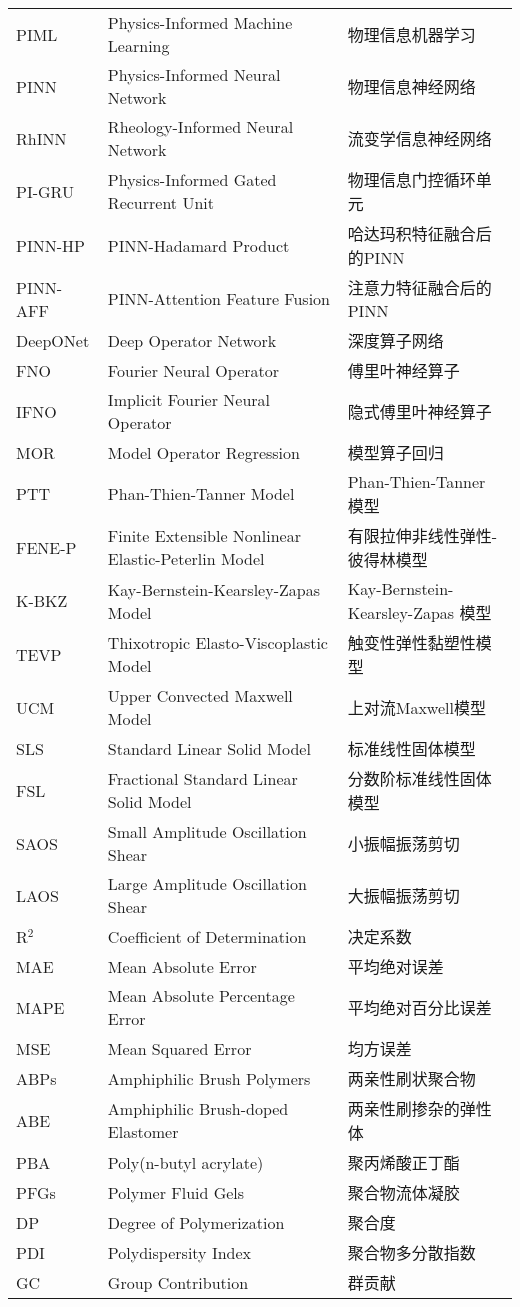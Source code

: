 \begin{longtable}{lll}
	PIML     & Physics-Informed Machine Learning                  & 物理信息机器学习\tabularnewline
	PINN     & Physics-Informed Neural Network                    & 物理信息神经网络\tabularnewline
	RhINN    & Rheology-Informed Neural Network                   & 流变学信息神经网络\tabularnewline
	PI-GRU   & Physics-Informed Gated Recurrent Unit              & 物理信息门控循环单元\tabularnewline
	PINN-HP  & PINN-Hadamard Product                              & 哈达玛积特征融合后的PINN\tabularnewline
	PINN-AFF & PINN-Attention Feature Fusion                      & 注意力特征融合后的PINN\tabularnewline

	DeepONet & Deep Operator Network                              & 深度算子网络\tabularnewline
	FNO      & Fourier Neural Operator                            & 傅里叶神经算子\tabularnewline
	IFNO     & Implicit Fourier Neural Operator                   & 隐式傅里叶神经算子\tabularnewline
	MOR      & Model Operator Regression                          & 模型算子回归\tabularnewline

	PTT      & Phan-Thien-Tanner Model                            & Phan-Thien-Tanner 模型\tabularnewline
	FENE-P   & Finite Extensible Nonlinear Elastic-Peterlin Model & 有限拉伸非线性弹性-彼得林模型\tabularnewline
	K-BKZ    & Kay-Bernstein-Kearsley-Zapas Model                 & Kay-Bernstein-Kearsley-Zapas 模型\tabularnewline
	TEVP     & Thixotropic Elasto-Viscoplastic Model              & 触变性弹性黏塑性模型\tabularnewline
	UCM      & Upper Convected Maxwell Model                      & 上对流Maxwell模型\tabularnewline
	SLS      & Standard Linear Solid Model                        & 标准线性固体模型\tabularnewline
	FSL      & Fractional Standard Linear Solid Model             & 分数阶标准线性固体模型\tabularnewline

	SAOS     & Small Amplitude Oscillation Shear                  & 小振幅振荡剪切\tabularnewline
	LAOS     & Large Amplitude Oscillation Shear                  & 大振幅振荡剪切\tabularnewline

	R$^2$    & Coefficient of Determination                       & 决定系数\tabularnewline
	MAE      & Mean Absolute Error                                & 平均绝对误差\tabularnewline
	MAPE     & Mean Absolute Percentage Error                     & 平均绝对百分比误差\tabularnewline
	MSE      & Mean Squared Error                                 & 均方误差\tabularnewline

	ABPs     & Amphiphilic Brush Polymers                         & 两亲性刷状聚合物\tabularnewline
	ABE      & Amphiphilic Brush-doped Elastomer                  & 两亲性刷掺杂的弹性体\tabularnewline
	PBA      & Poly(n-butyl acrylate)                             & 聚丙烯酸正丁酯\tabularnewline
	PFGs     & Polymer Fluid Gels                                 & 聚合物流体凝胶\tabularnewline
	DP       & Degree of Polymerization                           & 聚合度\tabularnewline
	PDI      & Polydispersity Index                               & 聚合物多分散指数\tabularnewline
	GC       & Group Contribution                                 & 群贡献\tabularnewline


\end{longtable}
